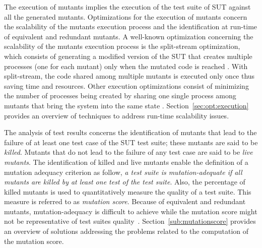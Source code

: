 The execution of mutants implies the execution of the test suite of SUT against all the generated mutants. 
Optimizations for the execution of mutants concern the scalability of the mutants execution process and 
the identification at run-time of equivalent and redundant mutants.
A well-known optimization concerning the scalability of the mutants execution process is the split-stream optimization, which consists of generating a modified version of the SUT that creates multiple processes (one for each mutant) only when the mutated code is reached \cite{tokumoto2016muvm}. With split-stream, the code shared among multiple mutants is executed only once thus saving time and resources. Other execution optimizations consist of minimizing the number of processes being created by sharing one single process among mutants that bring the system into the same state \cite{wang2017faster}.
Section~\ref{sec:opt:execution} provides an overview of techniques to address run-time scalability issues.



The analysis of test results concerns the identification of mutants that lead to the failure of at least one test case of the SUT test suite; these mutants are said to be \emph{killed}. Mutants that do not lead to the failure of any test case are said to be \emph{live mutants}. The identification of killed and live mutants enable the definition of a mutation adequacy criterion as follow, \emph{a test suite is mutation-adequate if all mutants are killed by at least one test of the test suite}. 
Also, the percentage of killed mutants is used to quantitatively measure the quality of a test suite. This measure is referred to as \emph{mutation score}.
Because of equivalent and redundant mutants, mutation-adequacy is difficult to achieve while the mutation score might not be representative of test suites quality~\cite{papadakis2016threats}. Section~\ref{sub:mutationscore} provides an overview of solutions addressing the problems related to the computation of the mutation score.



